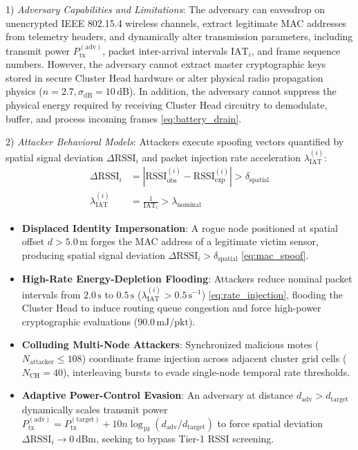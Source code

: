 \documentclass[conference]{IEEEtran}
\begin{document}
1) \textit{Adversary Capabilities and Limitations}: The adversary can eavesdrop on unencrypted IEEE 802.15.4 wireless channels, extract legitimate MAC addresses from telemetry headers, and dynamically alter transmission parameters, including transmit power $P_\text{tx}^{(\text{adv})}$, packet inter-arrival intervals $\text{IAT}_i$, and frame sequence numbers. However, the adversary cannot extract master cryptographic keys stored in secure Cluster Head hardware or alter physical radio propagation physics ($n = 2.7, \sigma_\text{dB} = 10\,\text{dB}$). In addition, the adversary cannot suppress the physical energy required by receiving Cluster Head circuitry to demodulate, buffer, and process incoming frames \eqref{eq:battery_drain}.

2) \textit{Attacker Behavioral Models}: Attackers execute spoofing vectors quantified by spatial signal deviation $\Delta\text{RSSI}_i$ and packet injection rate acceleration $\lambda_\text{IAT}^{(i)}$:
\begin{align}
\Delta\text{RSSI}_i &= |\text{RSSI}_\text{obs}^{(i)} - \text{RSSI}_\text{exp}^{(i)}| > \delta_\text{spatial} \label{eq:mac_spoof} \\[4pt]
\lambda_\text{IAT}^{(i)} &= \frac{1}{\text{IAT}_i} > \lambda_\text{nominal} \label{eq:rate_injection}
\end{align}
\begin{itemize}
    \item \textbf{Displaced Identity Impersonation}: A rogue node positioned at spatial offset $d > 5.0\,\text{m}$ forges the MAC address of a legitimate victim sensor, producing spatial signal deviation $\Delta\text{RSSI}_i > \delta_\text{spatial}$ \eqref{eq:mac_spoof}.
    \item \textbf{High-Rate Energy-Depletion Flooding}: Attackers reduce nominal packet intervals from $2.0\,\text{s}$ to $0.5\,\text{s}$ ($\lambda_\text{IAT}^{(i)} > 0.5\,\text{s}^{-1}$) \eqref{eq:rate_injection}, flooding the Cluster Head to induce routing queue congestion and force high-power cryptographic evaluations ($90.0\,\text{mJ/pkt}$).
    \item \textbf{Colluding Multi-Node Attackers}: Synchronized malicious motes ($N_\text{attacker} \le 108$) coordinate frame injection across adjacent cluster grid cells ($N_\text{CH}=40$), interleaving bursts to evade single-node temporal rate thresholds.
    \item \textbf{Adaptive Power-Control Evasion}: An adversary at distance $d_\text{adv} > d_\text{target}$ dynamically scales transmit power $P_\text{tx}^{(\text{adv})} = P_\text{tx}^{(\text{target})} + 10n \log_{10}(d_\text{adv}/d_\text{target})$ to force spatial deviation $\Delta\text{RSSI}_i \to 0\,\text{dBm}$, seeking to bypass Tier-1 RSSI screening.
\end{itemize}
\end{document}
